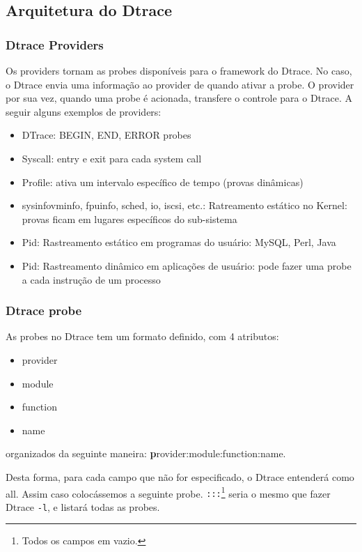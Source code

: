 \documentclass[a4paper]{scrartcl}
\begin{document}
\subsection{Arquitetura do Dtrace}

\subsubsection{Dtrace Providers}

Os providers tornam as probes disponíveis para o framework do Dtrace. No caso, o Dtrace envia uma informação ao provider de quando ativar a probe. O provider por sua vez, quando uma probe é acionada, transfere o controle para o Dtrace. A seguir alguns exemplos de providers:

\begin{itemize}
	\item DTrace: BEGIN, END, ERROR probes
	\item Syscall: entry e exit para cada system call
	\item Profile: ativa um intervalo específico de tempo (provas dinâmicas)
	\item sysinfovminfo, fpuinfo, sched, io, iscsi, etc.: Ratreamento estático no Kernel: provas ficam em lugares específicos do sub-sistema
	\item Pid: Rastreamento estático em programas do usuário: MySQL, Perl, Java
	\item Pid: Rastreamento dinâmico em aplicações de usuário: pode fazer uma probe a cada instrução de um processo
\end{itemize}

\subsubsection{Dtrace probe}

As probes no Dtrace tem um formato definido, com 4 atributos:

\begin{itemize}
	\item provider
	\item module
	\item function
	\item name
\end{itemize}

organizados da seguinte maneira: {\textbf provider:module:function:name}.

Desta forma, para cada campo que não for especificado, o Dtrace entenderá como all. Assim caso colocássemos a seguinte probe. {\tt :::}\footnote{Todos os campos em vazio.} seria o mesmo que fazer Dtrace {\tt -l}, e listará todas as probes.
\end{document}
